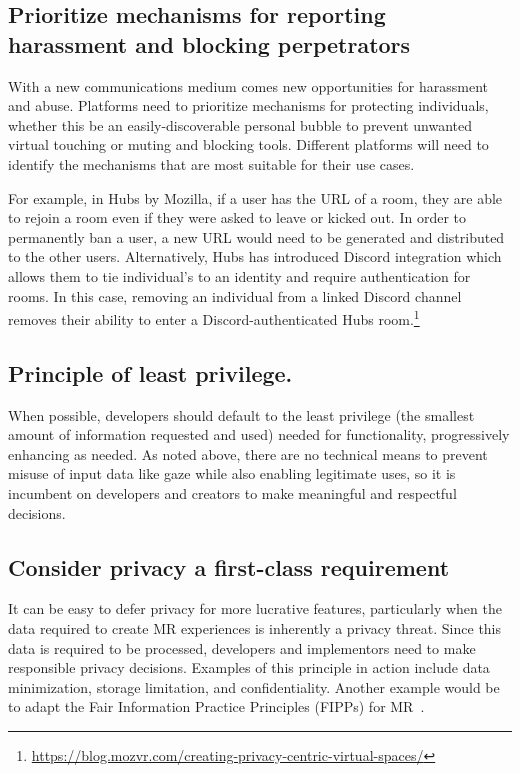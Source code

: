 \subsection{Prioritize mechanisms for reporting harassment and blocking perpetrators}
With a new communications medium comes new opportunities for harassment and abuse. Platforms need to prioritize mechanisms for protecting individuals, whether this be an easily-discoverable personal bubble to prevent unwanted virtual touching or muting and blocking tools. Different platforms will need to identify the mechanisms that are most suitable for their use cases. 

For example, in Hubs by Mozilla, if a user has the URL of a room, they are able to rejoin a room even if they were asked to leave or kicked out. In order to permanently ban a user, a new URL would need to be generated and distributed to the other users. Alternatively, Hubs has introduced Discord integration which allows them to tie individual's to an identity and require authentication for rooms. In this case, removing an individual from a linked Discord channel removes their ability to enter a Discord-authenticated Hubs room.\footnote{\url{https://blog.mozvr.com/creating-privacy-centric-virtual-spaces/}}

\subsection{Principle of least privilege.}
When possible, developers should default to the least privilege (the smallest amount of information requested and used) needed for functionality, progressively enhancing as needed. As noted above, there are no technical means to prevent misuse of input data like gaze while also enabling legitimate uses, so it is incumbent on developers and creators to make meaningful and respectful decisions.

\subsection{Consider privacy a first-class requirement}
It can be easy to defer privacy for more lucrative features, particularly when the data required to create MR experiences is inherently a privacy threat. Since this data is required to be processed,  developers and implementors need to make responsible privacy decisions. Examples of this principle in action include data minimization, storage limitation, and confidentiality. Another example would be to adapt the Fair Information Practice Principles (FIPPs) for MR~\cite{fipps}.

